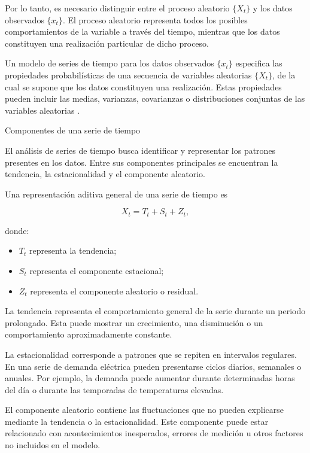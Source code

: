 Por lo tanto, es necesario distinguir entre el proceso aleatorio $\{X_t\}$ y los datos observados $\{x_t\}$. El proceso aleatorio representa todos los posibles comportamientos de la variable a través del tiempo, mientras que los datos constituyen una realización particular de dicho proceso.

Un modelo de series de tiempo para los datos observados $\{x_t\}$ especifica las propiedades probabilísticas de una secuencia de variables aleatorias $\{X_t\}$, de la cual se supone que los datos constituyen una realización. Estas propiedades pueden incluir las medias, varianzas, covarianzas o distribuciones conjuntas de las variables aleatorias \cite{brockwell2016introduction}.

Componentes de una serie de tiempo

El análisis de series de tiempo busca identificar y representar los patrones presentes en los datos. Entre sus componentes principales se encuentran la tendencia, la estacionalidad y el componente aleatorio.

Una representación aditiva general de una serie de tiempo es

\begin{equation}
    X_t=T_t+S_t+Z_t,
\end{equation}

donde:

\begin{itemize}
    \item $T_t$ representa la tendencia;
    \item $S_t$ representa el componente estacional;
    \item $Z_t$ representa el componente aleatorio o residual.
\end{itemize}

La tendencia representa el comportamiento general de la serie durante un periodo prolongado. Esta puede mostrar un crecimiento, una disminución o un comportamiento aproximadamente constante.

La estacionalidad corresponde a patrones que se repiten en intervalos regulares. En una serie de demanda eléctrica pueden presentarse ciclos diarios, semanales o anuales. Por ejemplo, la demanda puede aumentar durante determinadas horas del día o durante las temporadas de temperaturas elevadas.

El componente aleatorio contiene las fluctuaciones que no pueden explicarse mediante la tendencia o la estacionalidad. Este componente puede estar relacionado con acontecimientos inesperados, errores de medición u otros factores no incluidos en el modelo.

